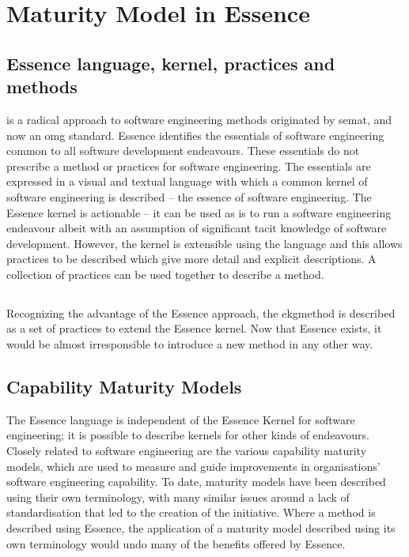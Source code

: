 \pagebreak
\chapter{Maturity Model in Essence}\label{ch:maturity-model-in-essence}

\section{Essence language, kernel, practices and methods}\label{subsec:essence-language-kernel-practices-and-methods}

 is a radical approach to software engineering methods originated by \gls{semat},
and now an \gls{omg}\cite{omgwebsite} standard.
Essence identifies the essentials of software engineering common to all software development endeavours.
These essentials do not prescribe a method or practices for software engineering.
The essentials are expressed in a visual and textual language with which a common kernel of software engineering
is described -- the essence of software engineering.
The Essence kernel is actionable -- it can be used as is to run a software engineering endeavour albeit
with an assumption of significant tacit knowledge of software development.
However, the kernel is extensible using the language and this allows practices to be described which give more detail
and explicit descriptions.
A collection of practices can be used together to describe a method.

\section{}\label{subsec:ekg-method}

Recognizing the advantage of the Essence approach, the \agnos \gls{ekgmethod} is described as
a set of practices to extend the Essence kernel.
Now that Essence exists, it would be almost irresponsible to introduce a new method in any other way.

\section{Capability Maturity Models}\label{subsec:capability-maturity-models}

The Essence language is independent of the Essence Kernel for software engineering;
it is possible to describe kernels for other kinds of endeavours.
Closely related to software engineering are the various capability maturity models, which are used to measure and
guide improvements in organisations' software engineering capability.
To date, maturity models have been described using their own terminology, with many similar issues around a lack of
standardisation that led to the creation of the  initiative.
Where a method is described using Essence, the application of a maturity model described using its own
terminology would undo many of the benefits offered by Essence.

